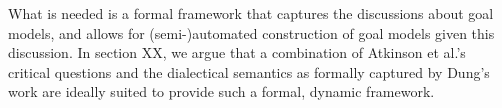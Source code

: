 What is needed is a formal framework that captures the discussions about goal models, and allows for (semi-)automated construction of goal models given this discussion. In section XX, we argue that a combination of Atkinson et al.'s~\cite{atkinson2007} critical questions and the dialectical semantics as formally captured by Dung's work \cite{Dung1995} are ideally suited to provide such a formal, dynamic framework.  
